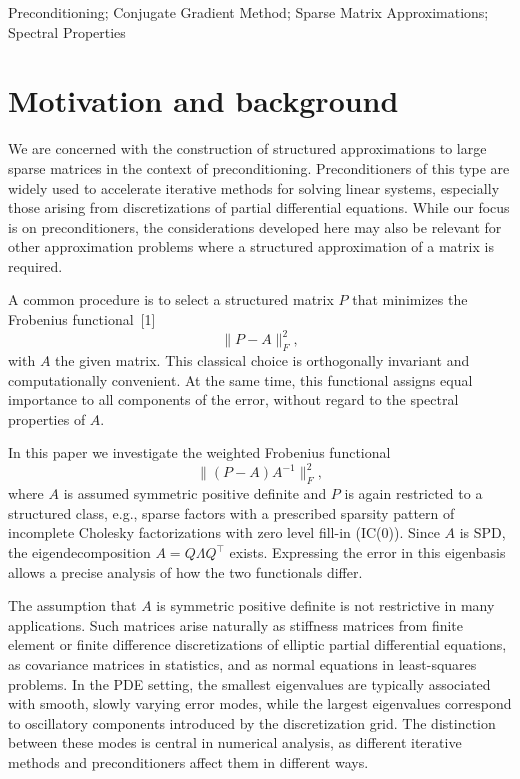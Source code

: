 \documentclass[conference]{IEEEtran}
\begin{document}
\begin{IEEEkeywords}
    Preconditioning; Conjugate Gradient Method; Sparse Matrix Approximations; Spectral Properties
\end{IEEEkeywords}


\section{Motivation and background}

We are concerned with the construction of structured approximations to large sparse matrices in the context of preconditioning. Preconditioners of this type are widely used to accelerate iterative methods for solving linear systems, especially those arising from discretizations of partial differential equations. While our focus is on preconditioners, the considerations developed here may also be relevant for other approximation problems where a structured approximation of a matrix is required.

A common procedure is to select a structured matrix $P$ that minimizes the Frobenius functional~[1]
\begin{equation}
    \label{eq:unweighted-frobenius}
\|P - A\|_F^2,
\end{equation}
with $A$ the given matrix. This classical choice is orthogonally invariant and computationally convenient. At the same time, this functional assigns equal importance to all components of the error, without regard to the spectral properties of $A$.

In this paper we investigate the weighted Frobenius functional
\begin{equation}
    \label{eq:weighted-frobenius}
\|(P - A)A^{-1}\|_F^2,
\end{equation}
where $A$ is assumed symmetric positive definite and $P$ is again restricted to a structured class, e.g., sparse factors with a prescribed sparsity pattern of incomplete Cholesky factorizations with zero level fill-in (IC(0)). Since $A$ is SPD, the eigendecomposition $A = Q \Lambda Q^\top$ exists. Expressing the error in this eigenbasis allows a precise analysis of how the two functionals differ.

The assumption that $A$ is symmetric positive definite is not restrictive in many applications. Such matrices arise naturally as stiffness matrices from finite element or finite difference discretizations of elliptic partial differential equations, as covariance matrices in statistics, and as normal equations in least-squares problems. In the PDE setting, the smallest eigenvalues are typically associated with smooth, slowly varying error modes, while the largest eigenvalues correspond to oscillatory components introduced by the discretization grid. The distinction between these modes is central in numerical analysis, as different iterative methods and preconditioners affect them in different ways.
\end{document}
